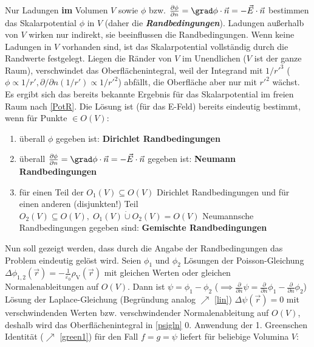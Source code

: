 		   Nur Ladungen \textbf{im} Volumen $V$ sowie $\phi$
		        bzw. $\frac{\partial\phi}{\partial n}=\grad \phi\cdot
			        \vec{n}=-\vec{E}\cdot\vec{n}$ bestimmen das Skalarpotential
		        $\phi$ in $V$ (daher die \textbf{\textit{Randbedingungen}}). Ladungen außerhalb von $V$ wirken nur indirekt, sie beeinflussen die Randbedingungen. Wenn keine Ladungen in $V$ vorhanden sind,
		        ist das Skalarpotential vollständig durch die Randwerte
		        festgelegt. Liegen die Ränder von $V$ im Unendlichen ($V$ ist der
		        ganze Raum), verschwindet das Oberflächenintegral, weil
		        der Integrand mit $1/r'^3$ ($\phi\propto 1/r', \partial/\partial n(1/r')\propto 1/r'^2$) abfällt, die Oberfläche aber nur mit $r'^2$ wächst. Es ergibt sich das
		        bereits bekannte Ergebnis für das Skalarpotential im
		        freien Raum nach \ref{PotR}. Die Lösung ist (für das E-Feld) bereits eindeutig bestimmt, wenn
		        für Punkte $\in O(V)$:
		        \begin{enumerate}
			        \item überall $\phi$ gegeben ist: \textbf{Dirichlet
				              Randbedingungen}
			        \item überall $\frac{\partial\phi}{\partial n}=\grad \phi\cdot
				              \vec{n}=-\vec{E}\cdot\vec{n}$ gegeben ist: \textbf{Neumann
				              Randbedingungen}
			        \item für einen Teil der $O_1(V)\subseteq O(V)$ Dirichlet
			              Randbedingungen und für einen anderen (disjunkten!) Teil $O_2(V)\subseteq
				              O(V),\; O_1(V) \mathbin{\dot{\cup}} O_2(V) = O(V)$ Neumannsche Randbedingungen gegeben sind:
			              \textbf{Gemischte Randbedingungen}
		        \end{enumerate}
		  Nun soll gezeigt werden, dass durch die Angabe der Randbedingungen das Problem eindeutig gelöst wird. Seien $\phi_1$ und $\phi_2$ Lösungen der Poisson-Gleichung
		        $\Delta \phi_{1,2}(\vec{r} ) =
			        -\frac{1}{\varepsilon_0}\rho_\text{V}(\vec{r} )$
		        mit gleichen Werten oder gleichen Normalenableitungen auf
		        $O(V)$. Dann ist $\psi=\phi_1-\phi_2$ ($\implies\frac{\partial}{\partial n}\psi=\frac{\partial}{\partial n}\phi_1-\frac{\partial}{\partial n}\phi_2$) Lösung der
		        Laplace-Gleichung (Begründung analog $\nearrow$ \ref{lin}) $\Delta \psi(\vec{r} ) = 0$
		        mit verschwindenden Werten bzw. verschwindender
		        Normalenableitung auf $O(V)$, deshalb wird das Oberflächenintegral in \ref{psigln} $0$. Anwendung der 1. Greenschen Identität ($\nearrow$ \ref{green1}) für den Fall $f=g=\psi$ liefert für beliebige Volumina $V$:
